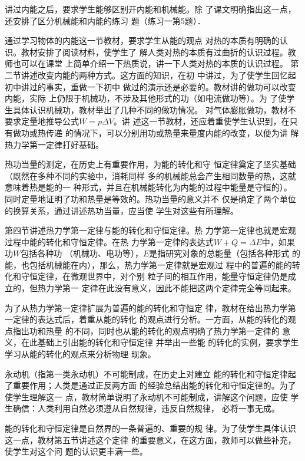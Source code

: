 讲过内能之后，要求学生能够区别开内能和机械能。除
了课文明确指出这一点，还安排了区分机械能和内能的练习
题（练习一第5题）．

通过学习物体的内能这一节教材，要求学生从能的观点
对热的本质有明确的认识。教材安排了阅读材料，使学生了
解人类对热的本质有过曲折的认识过程。教师也可以在课堂
上简单介绍一下热质说，讲一下人类对热的本质的认识过程。
第二节讲述改变内能的两种方式。这方面的知识，在初
中讲过，为了使学生回忆起初中讲过的事实，重做一下初中
做过的演示还是必要的。教材讲的做功可以改变内能，实际
上仍限于机械功，不涉及其他形式的功（如电流做功等）。为
了使学生具体认识机械功，教材举出了几种不同的做功情况。
对气体膨胀做功，教材不要求定量地推导公式$W=p\Delta V$。讲
述这一节教材，还应着重使学生认识到，在只有做功或热传递
的情况下，可以分别用功或热量来量度内能的改变，以便为讲
解热力学第一定律打好基础。

热功当量的测定，在历史上有重要作用，为能的转化和守
恒定律奠定了坚实基础（既然在多种不同的实验中，消耗同样
多的机械能总会产生相同数量的热，这就意味着热是能的一
种形式，并且在机械能转化为内能的过程中能量是守恒的）。
同时定量地证明了功和热量是等效的。热功当量的意义并不
仅是确定了两个单位的换算关系，通过讲述热功当量，应当使
学生对这些有所理解。

第四节讲述热力学第一定律与能的转化和守恒定律。热
力学第一定律也就是宏观过程中能的转化和守恒定律。在热
力学第一定律的表达式$W+Q=\Delta E$中，如果功$W$包括各种功
（机械功、电功等），$E$是指研究对象的总能量（包括各种形式
的能，也包括机械能在内），那么，热力学第一定律就是宏观过
程中的普遍的能的转化和守恒定律，在微观世界中，对个别
粒子间的相互作用，能量守恒定律仍是成立的，但热力学第一
定律在此没有意义，因此不能把这两个定律完全等同起来。

为了从热力学第一定律扩展为普遍的能的转化和守恒定
律，教材在给出热力学第一定律的表达式后，着重从能的转化
的观点进行分析。一方面，从能的转化的观点指出功和热量
的不同，同时也从能的转化的观点明确了热力学第一定律的
意义，在此基础上引出能的转化和守恒定律 并举出一些能
的转化的实例，要求学生学习从能的转化的观点来分析物理
现象。

永动机（指第一类永动机）不可能制成，在历史上对建立
能的转化和守恒定律起了重要作用；人类是通过正反两方面
的经验总结出能的转化和守恒定律的。为了使学生理解这一
点，教材简单说明了永动机不可能制成，讲解这个问题，应使
学生确信：人类利用自然必须遵从自然规律，违反自然规律，
必将一事无成。

能的转化和守恒定律是自然界的一条普遍的、重要的规
律。为了使学生具体认识这一点，教材第五节讲述这个定律
的重要意义，在这方面，教师可以做些补充，使学生对这个问
题的认识更丰满一些。

